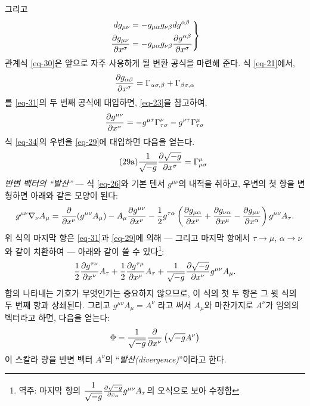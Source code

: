그리고
\begin{equation} \label{eq-32}
	\left.
	\begin{aligned}
		dg_{\mu\nu}&=- g_{\mu\alpha} g_{\nu\beta} dg^{\alpha\beta} \\
		{\frac{{\partial}{g_{\mu\nu}}}{{\partial}{x^\sigma}}}
		&= -g_{\mu\alpha} g_{\nu\beta} {\frac{{\partial}{g^{\alpha\beta}}}{{\partial}{x^\sigma}}}
	\end{aligned}
	\right\}
\end{equation}
관계식 \eqref{eq-30}은 앞으로 자주 사용하게 될 변환 공식을 마련해 준다.  
식 \eqref{eq-21}에서,
\begin{equation} \label{eq-33}
	{\frac{{\partial}{g_{\alpha\beta}}}{{\partial}{x^\sigma}}}=\Gamma_{\alpha\sigma,\beta}+\Gamma_{\beta\sigma,\alpha}
\end{equation}를 \eqref{eq-31}의 두 번째 공식에 대입하면, \eqref{eq-23}을 참고하여,
\begin{equation} \label{eq-34}
	{\frac{{\partial}{g^{\mu\nu}}}{{\partial}{x^\sigma}}}
	= - g^{\mu\tau} \Gamma_{\tau\sigma}^{\nu} - g^{\nu\tau} \Gamma_{\tau\sigma}^{\mu}
\end{equation}
식 \eqref{eq-34}의 우변을 \eqref{eq-29}에 대입하면 다음을 얻는다.
\begin{equation} \tag{29a} \label{eq-29a}
	\dfrac{1}{\sqrt{-g}}{\frac{{\partial}{\sqrt{-g}}}{{\partial}{x^\sigma}}}
	=\Gamma_{\mu\sigma}^\mu 
\end{equation}
\emph{반변 벡터의 ``발산''} ---
식 \eqref{eq-26}와 기본 텐서 $g^{\mu\nu}$의 내적을 취하고, 우변의 첫 항을 변형하면 아래와 같은 모양이 된다:
\begin{equation*}
	g^{\mu\nu} \nabla_\nu A_\mu = {\frac{{\partial}{}}{{\partial}{x^\nu}}}(g^{\mu\nu}A_\mu)
	- A_\mu {\frac{{\partial}{g^{\mu\nu}}}{{\partial}{x^\nu}}}
	- \frac{1}{2}g^{\tau\alpha}\left(
	{\frac{{\partial}{g_{\mu\alpha}}}{{\partial}{x^\nu}}}
	+ {\frac{{\partial}{g_{\nu\alpha}}}{{\partial}{x^\mu}}}
	- {\frac{{\partial}{g_{\mu\nu}}}{{\partial}{x^\alpha}}}
	\right) g^{\mu\nu} A_\tau .
\end{equation*}
위 식의 마지막 항은 \eqref{eq-31}과 \eqref{eq-29}에 의해 --- 그리고 마지막 항에서 $\tau\rightarrow\mu$, $\alpha\rightarrow\nu$ 와 같이 \Index\을 치환하여 --- 아래와 같이 쓸 수 있다\footnote{역주: 마지막 항의 $\dfrac{1}{\sqrt{-g}}{\frac{{\partial}{\sqrt{-g}}}{{\partial}{x_\alpha}}} g^{\mu\nu} A_\tau $의  오식으로 보아 수정함}:
\begin{equation*}
	\frac{1}{2} {\frac{{\partial}{g^{\tau\nu}}}{{\partial}{x^\nu}}} A_\tau
	+ \frac{1}{2} {\frac{{\partial}{g^{\tau\mu}}}{{\partial}{x^\mu}}} A_\tau
	+ \dfrac{1}{\sqrt{-g}}{\frac{{\partial}{\sqrt{-g}}}{{\partial}{x^\nu}}} g^{\mu\nu} A_\mu .
\end{equation*}
합의 \Index\을 나타내는 기호가 무엇인가는 중요하지 않으므로, 이 식의 첫 두 항은 그 윗 식의 두 번째 항과 상쇄된다. 그리고 $ g^{\mu\nu}A_\mu=A^\nu $ 라고 써서 $ A_\mu $와 마찬가지로 $ A^\nu $가 임의의 벡터라고 하면, 다음을 얻는다:
\begin{equation} \label{eq-35}
	\Phi = \dfrac{1}{\sqrt{-g}}{\frac{{\partial}{}}{{\partial}{x^\nu}}} \left( \sqrt{-g} A^\nu \right)
\end{equation}
이 스칼라 량을 반변 벡터 $A^\nu$의 ``\emph{발산(divergence)}''이라고 한다.

